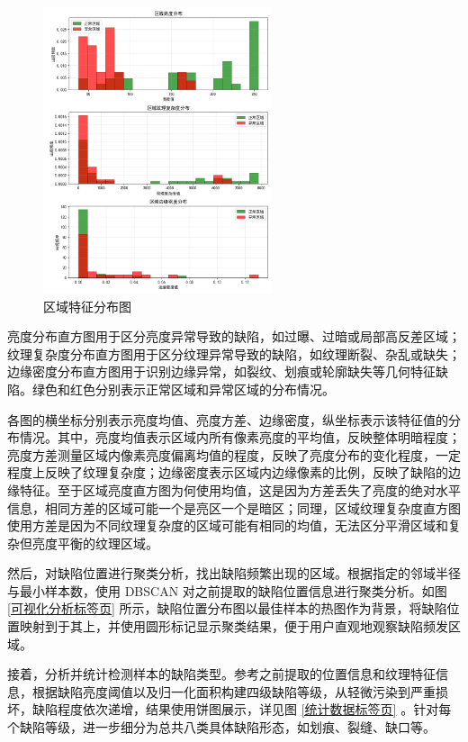 \documentclass[
  ]{njuthesis}
\begin{document}
\begin{figure}[htb]
    \centering
    \includegraphics[width=0.6\textwidth]{images/区域特征分布图.png}
    \caption{区域特征分布图}
    \label{区域特征分布图}
\end{figure}

亮度分布直方图用于区分亮度异常导致的缺陷，如过曝、过暗或局部高反差区域；纹理复杂度分布直方图用于区分纹理异常导致的缺陷，如纹理断裂、杂乱或缺失；边缘密度分布直方图用于识别边缘异常，如裂纹、划痕或轮廓缺失等几何特征缺陷。绿色和红色分别表示正常区域和异常区域的分布情况。

各图的横坐标分别表示亮度均值、亮度方差、边缘密度，纵坐标表示该特征值的分布情况。其中，亮度均值表示区域内所有像素亮度的平均值，反映整体明暗程度；亮度方差测量区域内像素亮度偏离均值的程度，反映了亮度分布的变化程度，一定程度上反映了纹理复杂度；边缘密度表示区域内边缘像素的比例，反映了缺陷的边缘特征。至于区域亮度直方图为何使用均值，这是因为方差丢失了亮度的绝对水平信息，相同方差的区域可能一个是亮区一个是暗区；同理，区域纹理复杂度直方图使用方差是因为不同纹理复杂度的区域可能有相同的均值，无法区分平滑区域和复杂但亮度平衡的纹理区域。

然后，对缺陷位置进行聚类分析，找出缺陷频繁出现的区域。根据指定的邻域半径与最小样本数，使用 DBSCAN 对之前提取的缺陷位置信息进行聚类分析。如图 \ref{可视化分析标签页} 所示，缺陷位置分布图以最佳样本的热图作为背景，将缺陷位置映射到于其上，并使用圆形标记显示聚类结果，便于用户直观地观察缺陷频发区域。

接着，分析并统计检测样本的缺陷类型。参考之前提取的位置信息和纹理特征信息，根据缺陷亮度阈值以及归一化面积构建四级缺陷等级，从轻微污染到严重损坏，缺陷程度依次递增，结果使用饼图展示，详见图 \ref{统计数据标签页} 。针对每个缺陷等级，进一步细分为总共八类具体缺陷形态，如划痕、裂缝、缺口等。
\end{document}
